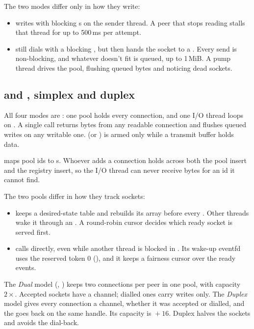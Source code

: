 The two modes differ only in how they write:
\begin{itemize}
  \item {} writes with blocking s on the sender thread. A peer
        that stops reading stalls that thread for up to 500\,ms per attempt.
  \item {} still dials with a blocking , but then hands
        the socket to a . Every send is non-blocking, and
        whatever doesn't fit is queued, up to 1\,MiB. A pump thread drives the pool,
        flushing queued bytes and noticing dead sockets.
\end{itemize}

\subsection{ and , simplex and duplex}

All four modes are : one pool holds every connection, and
one I/O thread loops on . A single call returns bytes from any
readable connection and flushes queued writes on any writable one. 
(or ) is armed only while a transmit buffer holds data.

 maps pool ids to s. Whoever adds a connection
holds  across both the pool insert and the registry insert, so
the I/O thread can never receive bytes for an id it cannot find.

The two pools differ in how they track sockets:
\begin{itemize}
  \item {} keeps a desired-state table and rebuilds its
         array before every . Other threads wake it through
        an . A round-robin cursor decides which ready socket is
        served first.
  \item {} calls  directly, even while
        another thread is blocked in . Its wake-up eventfd uses the
        reserved token 0 (), and it keeps a fairness cursor over the
        ready events.
\end{itemize}

The \emph{Dual} model (, ) keeps two connections per peer in
one pool, with capacity $2\times$. Accepted sockets have a channel;
dialled ones carry writes only. The \emph{Duplex} model gives every connection a
channel, whether it was accepted or dialled, and the  goes back on
the same handle. Its capacity is ${}+16$. Duplex halves the sockets
and avoids the dial-back.

